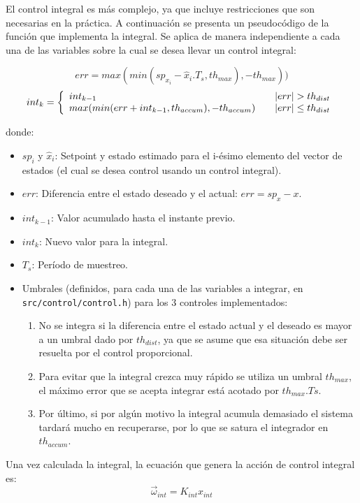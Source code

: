 \documentclass[main]{subfiles}
\begin{document}
El control integral es m\'as complejo, ya que incluye restricciones que son necesarias en la pr\'actica. A continuaci\'on se presenta un pseudoc\'odigo de la funci\'on que implementa la integral. Se aplica de manera independiente a cada una de las variables sobre la cual se desea llevar un control integral:

$$
err = max(min(sp_{x_i} - \hat{x}_i.T_s,th_{max}), -th_{max}))
$$
\[
int_k = \left\{
  \begin{array}{l l}
    int_{k-1} & \quad \vert err \vert > th_{dist} \\
    max(min(err + int_{k-1}, th_{accum}),-th_{accum}) & \quad \vert err \vert \leq th_{dist} \\
  \end{array} \right.
\]

donde:
\begin{itemize}
\item $sp_i$ y $\hat{x}_i$: Setpoint y estado estimado para el i-\'esimo elemento del vector de estados (el cual se desea control usando un control integral).
\item $err$: Diferencia entre el estado deseado y el actual: $err = sp_{x} - x$.
\item $int_{k-1}$: Valor acumulado hasta el instante previo.
\item $int_{k}$: Nuevo valor para la integral.
\item $T_s$: Per\'iodo de muestreo.
\item Umbrales (definidos, para cada una de las variables a integrar, en \newline\verb+src/control/control.h+) para los 3 controles implementados:
  \begin{enumerate}
  \item No se integra si la diferencia entre el estado actual y el deseado es mayor a un umbral dado por $th_{dist}$, ya que se asume que esa situaci\'on debe ser resuelta por el control proporcional.
  \item Para evitar que la integral crezca muy r\'apido se utiliza un umbral $th_{max}$, el m\'aximo error que se acepta integrar est\'a acotado por $th_{max}.Ts$.
  \item Por \'ultimo, si por alg\'un motivo la integral acumula demasiado el sistema tardar\'a mucho en recuperarse, por lo que se satura el integrador en $th_{accum}$.
\end{enumerate}
\end{itemize}

Una vez calculada la integral, la ecuaci\'on que genera la acci\'on de control integral es:
\begin{equation}
  \label{eq:software:int}
  \vec{\omega}_{int} = K_{int} x_{int}
\end{equation}
\end{document}
